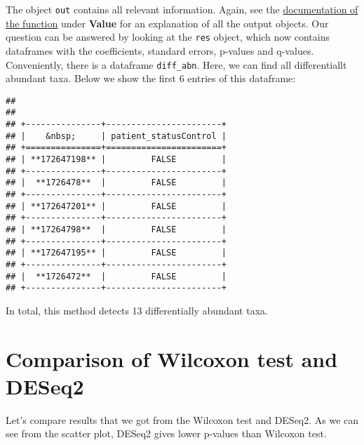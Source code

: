 \documentclass[
  oneside]{book}
\newenvironment{Shaded}{\begin{snugshade}}{\end{snugshade}}
\newcommand{\DataTypeTok}[1]{\textcolor[rgb]{0.13,0.29,0.53}{#1}}
\newcommand{\KeywordTok}[1]{\textcolor[rgb]{0.13,0.29,0.53}{\textbf{#1}}}
\newcommand{\NormalTok}[1]{#1}
\newcommand{\OperatorTok}[1]{\textcolor[rgb]{0.81,0.36,0.00}{\textbf{#1}}}
\newcommand{\StringTok}[1]{\textcolor[rgb]{0.31,0.60,0.02}{#1}}
\begin{document}
The object \texttt{out} contains all relevant information. Again, see the
\href{https://rdrr.io/github/FrederickHuangLin/ANCOMBC/man/ancombc.html}{documentation of the function}
under \textbf{Value} for an explanation of all the output objects. Our question can be answered
by looking at the \texttt{res} object, which now contains dataframes with the coefficients,
standard errors, p-values and q-values. Conveniently, there is a dataframe \texttt{diff\_abn}.
Here, we can find all differentiallt abundant taxa. Below we show the first 6 entries of this dataframe:

\begin{Shaded}
\end{Shaded}

\begin{verbatim}
## 
## 
## +---------------+-----------------------+
## |    &nbsp;     | patient_statusControl |
## +===============+=======================+
## | **172647198** |         FALSE         |
## +---------------+-----------------------+
## |  **1726478**  |         FALSE         |
## +---------------+-----------------------+
## | **172647201** |         FALSE         |
## +---------------+-----------------------+
## | **17264798**  |         FALSE         |
## +---------------+-----------------------+
## | **172647195** |         FALSE         |
## +---------------+-----------------------+
## |  **1726472**  |         FALSE         |
## +---------------+-----------------------+
\end{verbatim}

In total, this method detects 13 differentially abundant taxa.

\hypertarget{comparison-of-wilcoxon-test-and-deseq2}{%
\section{Comparison of Wilcoxon test and DESeq2}\label{comparison-of-wilcoxon-test-and-deseq2}}

Let's compare results that we got from the Wilcoxon test and DESeq2.
As we can see from the scatter plot, DESeq2 gives lower p-values than Wilcoxon test.
\end{document}
